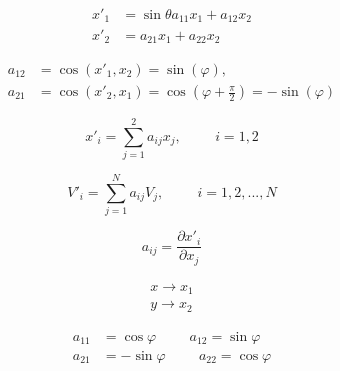 \documentclass{article}
\begin{document}
	
	\begin{equation}
		\begin{split}
			x'_{1} &= \sin \theta a_{11}x_{1} + a_{12}x_{2} \\
			x'_{2} &= a_{21}x_{1} + a_{22}x_{2}
		\end{split}	
		\label{ec1}	
	\end{equation}
	
	\begin{equation}
		\begin{split}
			a_{12} &= \cos (x'_{1},  x_{2}) = \sin (\varphi), \\
			a_{21} &= \cos (x'_{2},  x_{1}) = \cos \left(\varphi+ \frac{\pi}{2} \right) = -\sin (\varphi)
		\end{split}
		\label{ec2}
	\end{equation}
	
	\begin{equation}
		x'_{i} = \sum_{j = 1}^{2} a_{ij}x_{j},  \hspace{1cm} i = 1, 2
		\label{ec3}
	\end{equation}
	
	\begin{equation}
		V'_{i} = \sum_{j = 1}^{N} a_{ij}V_{j}, \hspace{1cm} i = 1, 2, ..., N
		\label{ec4}
	\end{equation}
	
	\begin{equation}
		a_{ij} = \frac{\partial x'_{i}}{\partial x_{j}}
		\label{ec5}
	\end{equation}

	\begin{equation*}
		\begin{split}
			x\rightarrow x_{1} \\
			y\rightarrow x_{2} 			
		\end{split}
		\label{ec6}
	\end{equation*}
	
	\begin{equation}
		\begin{split}
			a_{11} &= \cos \varphi  \hspace{1cm}  a_{12} = \sin \varphi \\
			a_{21} &= -\sin \varphi  \hspace{1cm} a_{22} = \cos \varphi
		\end{split}
		\label{ec7}
	\end{equation}
	
\end{document}
